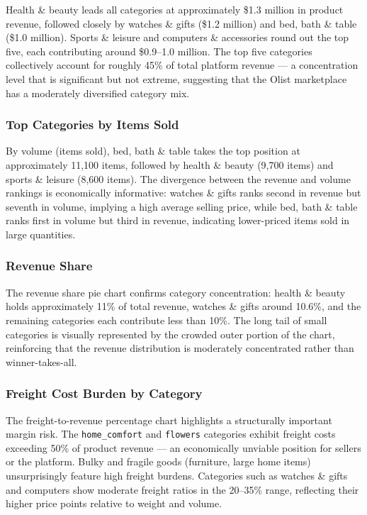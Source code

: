 \documentclass[12pt,a4paper]{article}
\begin{document}
Health \& beauty leads all categories at approximately \$1.3 million in product revenue,
followed closely by watches \& gifts (\$1.2 million) and bed, bath \& table (\$1.0 million).
Sports \& leisure and computers \& accessories round out the top five, each contributing
around \$0.9--1.0 million. The top five categories collectively account for roughly 45\% of
total platform revenue — a concentration level that is significant but not extreme, suggesting
that the Olist marketplace has a moderately diversified category mix.

\subsubsection{Top Categories by Items Sold}

By volume (items sold), bed, bath \& table takes the top position at approximately 11,100
items, followed by health \& beauty (9,700 items) and sports \& leisure (8,600 items). The
divergence between the revenue and volume rankings is economically informative: watches
\& gifts ranks second in revenue but seventh in volume, implying a high average selling
price, while bed, bath \& table ranks first in volume but third in revenue, indicating
lower-priced items sold in large quantities.

\subsubsection{Revenue Share}

The revenue share pie chart confirms category concentration: health \& beauty holds
approximately 11\% of total revenue, watches \& gifts around 10.6\%, and the remaining
categories each contribute less than 10\%. The long tail of small categories is visually
represented by the crowded outer portion of the chart, reinforcing that the revenue
distribution is moderately concentrated rather than winner-takes-all.

\subsubsection{Freight Cost Burden by Category}

The freight-to-revenue percentage chart highlights a structurally important margin risk. The
\texttt{home\_comfort} and \texttt{flowers} categories exhibit freight costs exceeding 50\%
of product revenue — an economically unviable position for sellers or the platform. Bulky
and fragile goods (furniture, large home items) unsurprisingly feature high freight burdens.
Categories such as watches \& gifts and computers show moderate freight ratios in the
20--35\% range, reflecting their higher price points relative to weight and volume.
\end{document}
